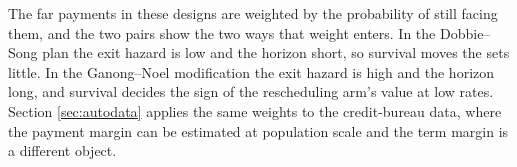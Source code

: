The far payments in these designs are weighted by the probability of still facing them, and the two pairs show the two ways that weight enters. In the Dobbie--Song plan the exit hazard is low and the horizon short, so survival moves the sets little. In the Ganong--Noel modification the exit hazard is high and the horizon long, and survival decides the sign of the rescheduling arm's value at low rates. Section \ref{sec:autodata} applies the same weights to the credit-bureau data, where the payment margin can be estimated at population scale and the term margin is a different object.
